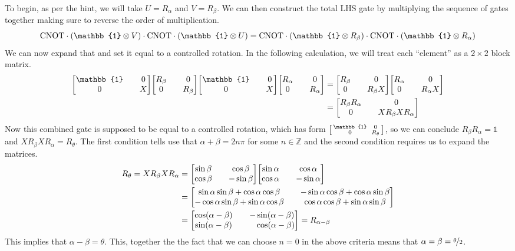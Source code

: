 \documentclass[boxes]{homework}
\begin{document}
\begin{solution}
	To begin, as per the hint, we will take $U = R_\alpha$ and $V = R_\beta$. We can then construct the total LHS gate by multiplying the sequence of gates together making sure to reverse the order of multiplication.
	\begin{equation*}
		\mathrm{CNOT}\cdot\qty(\mathbb{1}\otimes V)\cdot\mathrm{CNOT}\cdot\qty(\mathbb{1}\otimes U) = \mathrm{CNOT}\cdot\qty(\mathbb{1}\otimes R_\beta)\cdot\mathrm{CNOT}\cdot\qty(\mathbb{1}\otimes R_\alpha)
	\end{equation*}
	We can now expand that and set it equal to a controlled rotation. In the following calculation, we will treat each ``element'' as a $2\times 2$ block matrix.
	\begin{align*}
		\mqty[\mathbb{1} && 0 \\ 0 && X]\mqty[R_\beta && 0 \\ 0 && R_\beta]\mqty[\mathbb{1} && 0 \\ 0 && X]\mqty[R_\alpha && 0 \\ 0 && R_\alpha] &= \mqty[R_\beta && 0 \\ 0 && R_\beta X]\mqty[R_\alpha && 0 \\ 0 && R_\alpha X] \\
		&= \mqty[R_\beta R_\alpha && 0 \\ 0 && XR_\beta X R_\alpha]
	\end{align*}
	Now this combined gate is supposed to be equal to a controlled rotation, which has form $\smqty[\mathbb{1} && 0 \\ 0 && R_\theta]$, so we can conclude $R_\beta R_\alpha = \mathbb{1}$ and $XR_\beta X R_\alpha = R_\theta$. The first condition tells use that $\alpha + \beta = 2n\pi$ for some $n\in\mathbb{Z}$ and the second condition requires us to expand the matrices.
	\begin{align*}
		R_\theta = XR_\beta X R_\alpha &= \mqty[\sin\beta && \cos\beta \\ \cos\beta && -\sin\beta]\mqty[\sin\alpha && \cos\alpha \\ \cos\alpha && -\sin\alpha] \\
		&= \mqty[\sin\alpha\sin\beta + \cos\alpha\cos\beta && -\sin\alpha\cos\beta + \cos\alpha\sin\beta \\ -\cos\alpha\sin\beta + \sin\alpha\cos\beta && \cos\alpha\cos\beta + \sin\alpha\sin\beta] \\
		&= \mqty[\cos(\alpha - \beta) && -\sin(\alpha - \beta) \\ \sin(\alpha - \beta) && \phantom{-}\cos(\alpha - \beta)] = R_{\alpha - \beta}
	\end{align*}
	This implies that $\alpha - \beta = \theta$. This, together the the fact that we can choose $n = 0$ in the above criteria means that $\alpha = \beta = \nicefrac{\theta}{2}$.
\end{solution}
\end{document}
